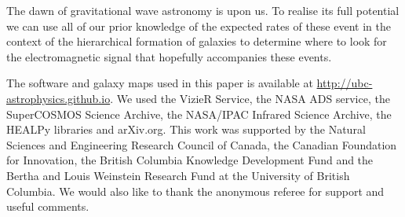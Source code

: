 \documentclass[useAMS,usenatbib]{mn2e}
\begin{document}
The dawn of gravitational wave astronomy is upon us.  To realise its
full potential we can use all of our prior knowledge of the expected
rates of these event in the context of the hierarchical formation of
galaxies to determine where to look for the electromagnetic signal
that hopefully accompanies these events.


The software and galaxy maps used in this paper is available at
\url{http://ubc-astrophysics.github.io}.  We used the VizieR Service,
the NASA ADS service, the SuperCOSMOS Science Archive, the NASA/IPAC
Infrared Science Archive, the HEALPy libraries and arXiv.org. This
work was supported by the Natural Sciences and Engineering Research
Council of Canada, the Canadian Foundation for Innovation, the British
Columbia Knowledge Development Fund and the Bertha and Louis Weinstein
Research Fund at the University of British Columbia.  We would also
like to thank the anonymous referee for support and useful comments.






\label{lastpage}
\end{document}
